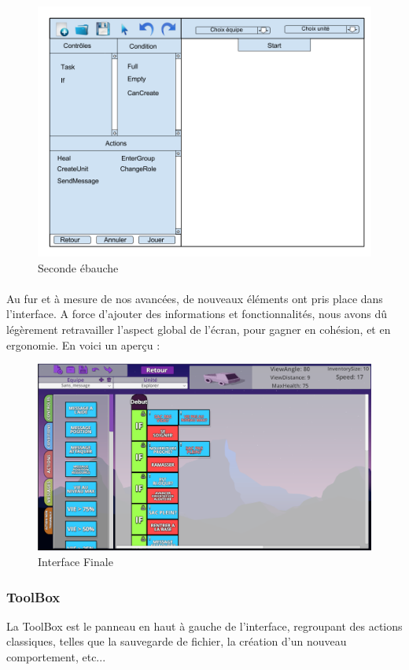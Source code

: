 \documentclass{report}
\begin{document}
\begin{figure}[!h]
	\centering
		\includegraphics[scale=0.35]{ConceptionGraphique2}
	\caption{Seconde ébauche}
\end{figure}


\paragraph{}
Au fur et à mesure de nos avancées, de nouveaux éléments ont pris place dans l'interface. A force d'ajouter des informations et fonctionnalités, nous avons dû légèrement retravailler l'aspect global de l'écran, pour gagner en cohésion, et en ergonomie.
En voici un aperçu :
\clearpage
\begin{figure}[!h]
	\centering
		\includegraphics[scale=0.50]{InterfaceFinale}
	\caption{Interface Finale}
\end{figure}
\subsubsection{ToolBox}
La ToolBox est le panneau en haut à gauche de l'interface, regroupant des actions classiques, telles que la sauvegarde de fichier, la création d'un nouveau comportement, etc...
\end{document}
